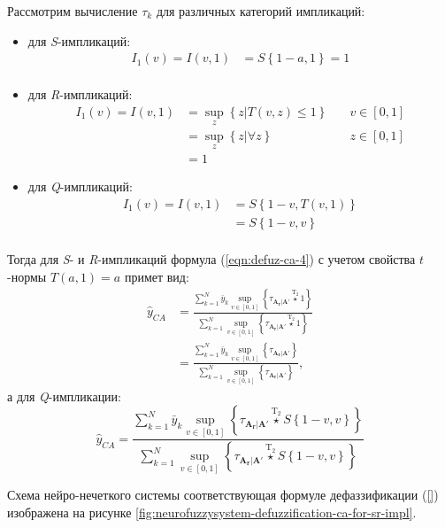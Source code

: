 Рассмотрим вычисление $\tau_k$ для различных категорий импликаций:
\begin{itemize}
	\item для \textit{S}-импликаций:
	\begin{align*}
		I_1(v) = I(v, 1) &= S\left\{1-a, 1\right\} = 1\\
	\end{align*}
	\item для \textit{R}-импликаций:
	\begin{align*}
		I_1(v) = I(v, 1) &= \sup_z \left\{z | T(v, z) \le 1\right\}&\quad v\in [0, 1]\\
		&= \sup_z \left\{z | \forall z\right\}&\quad z\in [0, 1]\\
		&= 1
	\end{align*}
	\item для \textit{Q}-импликаций:
	\begin{align*}
		I_1(v) = I(v, 1) &= S\left\{1-v, T(v, 1)\right\}\\
		&= S\left\{1-v, v\right\}\\
	\end{align*}
\end{itemize}


Тогда для \textit{S}- и \textit{R}-импликаций формула (\ref{eqn:defuz-ca-4}) с учетом свойства $t$-нормы $T(a, 1) = a$ примет вид:
\begin{align}
\hat{y}_{CA} &= \frac{\sum_{k=1}^{N} \bar{y}_k \sup_{v\in [0, 1]} \left\{\tau_{\mathbf{A_r}|\mathbf{A'}}\overset{\mathrm{T}_2}{\star} 1 \right\}}{\sum_{k=1}^{N} \sup_{v\in [0, 1]} \left\{\tau_{\mathbf{A_r}|\mathbf{A'}}\overset{\mathrm{T}_2}{\star} 1 \right\}}\\ &= \frac{\sum_{k=1}^{N} \bar{y}_k \sup_{v\in [0, 1]} \left\{\tau_{\mathbf{A_r}|\mathbf{A'}}\right\}}{\sum_{k=1}^{N} \sup_{v\in [0, 1]} \left\{\tau_{\mathbf{A_r}|\mathbf{A'}}\right\}},
\end{align}
а для \textit{Q}-импликации:
\begin{equation}
	\hat{y}_{CA} = \frac{\sum_{k=1}^{N} \bar{y}_k \sup_{v\in [0, 1]} \left\{\tau_{\mathbf{A_r}|\mathbf{A'}}\overset{\mathrm{T}_2}{\star} S\left\{1-v, v\right\} \right\}}{\sum_{k=1}^{N} \sup_{v\in [0, 1]} \left\{\tau_{\mathbf{A_r}|\mathbf{A'}}\overset{\mathrm{T}_2}{\star} S\left\{1-v, v\right\} \right\}}
\end{equation}

Схема нейро-нечеткого системы соответствующая формуле дефаззификации (\ref{}) изображена на рисунке \cref{fig:neurofuzzysystem-defuzzification-ca-for-sr-impl}.

